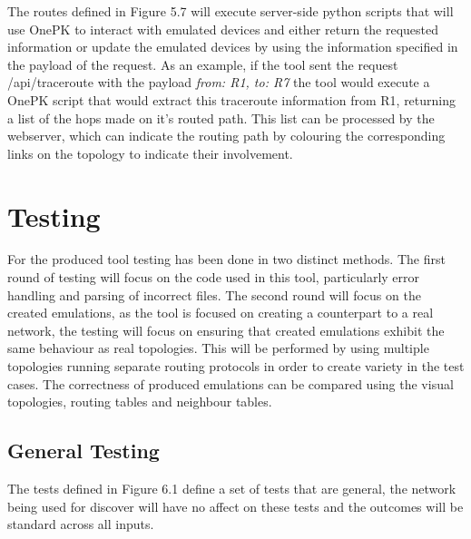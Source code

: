 \documentclass[11pt]{report}
\begin{document}
The routes defined in Figure 5.7 will execute server-side python scripts that will use OnePK to interact with emulated devices and either return the requested information or update the emulated devices by using the information specified in the payload of the request. As an example, if the tool sent the request /api/traceroute with the payload \textit{from: R1, to: R7} the tool would execute a OnePK script that would extract this traceroute information from R1, returning a list of the hops made on it's routed path. This list can be processed by the webserver, which can indicate the routing path by colouring the corresponding links on the topology to indicate their involvement.

\chapter{Testing}

For the produced tool testing has been done in two distinct methods. The first round of testing will focus on the code used in this tool, particularly error handling and parsing of incorrect files. The second round will focus on the created emulations, as the tool is focused on creating a counterpart to a real network, the testing will focus on ensuring that created emulations exhibit the same behaviour as real topologies. This will be performed by using multiple topologies running separate routing protocols in order to create variety in the test cases. The correctness of produced emulations can be compared using the visual topologies, routing tables and neighbour tables.

\section{General Testing}

The tests defined in Figure 6.1 define a set of tests that are general, the network being used for discover will have no affect on these tests and the outcomes will be standard across all inputs.
\end{document}
